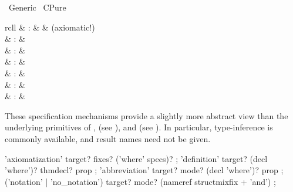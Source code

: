 %
\begin{isabellebody}%
\def\isabellecontext{Generic}%
%
\isadelimtheory
\isanewline
\isanewline
%
\endisadelimtheory
%
\isatagtheory
{}\isamarkupfalse%
\ Generic\isanewline
{}\ CPure\isanewline
{}%
\endisatagtheory
{\isafoldtheory}%
%
\isadelimtheory
%
\endisadelimtheory
%
\isamarkuptrue%
%
\isamarkuptrue%
%
\isamarkuptrue%
%
\begin{isamarkuptext}%
\begin{matharray}{rcll}
    \mbox{} & : &  & (axiomatic!)\\
    \mbox{} & : &  \\
    \mbox{} & : & \isaratt \\
    \mbox{} & : &  \\
    \mbox{}\isa{\isactrlsup {\isacharasterisk}} & : &  \\
    \mbox{} & : &  \\
    \mbox{} & : &  \\
  \end{matharray}

  These specification mechanisms provide a slightly more abstract view
  than the underlying primitives of \mbox{}, \mbox{} (see ), and \mbox{} (see
  ).  In particular, type-inference is commonly
  available, and result names need not be given.

  \begin{rail}
    'axiomatization' target? fixes? ('where' specs)?
    ;
    'definition' target? (decl 'where')? thmdecl? prop
    ;
    'abbreviation' target? mode? (decl 'where')? prop
    ;
    ('notation' | 'no\_notation') target? mode? (nameref structmixfix + 'and')
    ;


\end{rail}
\end{isamarkuptext}
\end{isabellebody}
